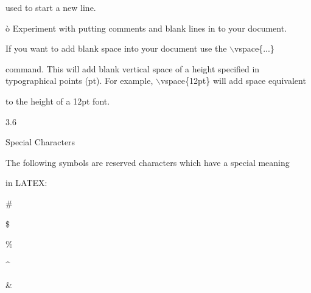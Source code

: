 \documentclass[a4paper,portrait,12pt]{article}
\begin{document}
\begin{flushleft}
used to start a new line.
\end{flushleft}


\begin{flushleft}
\`{o} Experiment with putting comments and blank lines in to your document.
\end{flushleft}


\begin{flushleft}
If you want to add blank space into your document use the \ensuremath{\backslash}vspace\{...\}
\end{flushleft}


\begin{flushleft}
command. This will add blank vertical space of a height specified in typographical points (pt). For example, \ensuremath{\backslash}vspace\{12pt\} will add space equivalent
\end{flushleft}


\begin{flushleft}
to the height of a 12pt font.
\end{flushleft}





3.6





\begin{flushleft}
Special Characters
\end{flushleft}





\begin{flushleft}
The following symbols are reserved characters which have a special meaning
\end{flushleft}


\begin{flushleft}
in LATEX:
\end{flushleft}


\#





\$





\%





\^{}





\&
\end{document}
